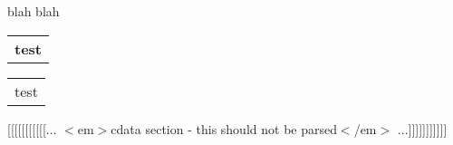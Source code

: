 

blah blah



\tabulinesep=1mm
\begin{longtabu}spread 0pt [c]{*{1}{|X[-1]}|}
\hline
{\bfseries{test}}   \\
\end{longtabu}


\tabulinesep=1mm
\begin{longtabu}spread 0pt [c]{*{1}{|X[-1]}|}
\hline


test





\\
\end{longtabu}


\mbox{[}\mbox{[}\mbox{[}\mbox{[}\mbox{[}\mbox{[}\mbox{[}\mbox{[}\mbox{[}\mbox{[}\mbox{[}... \texorpdfstring{$<$}{<}em\texorpdfstring{$>$}{>}cdata section -\/ this should not be parsed\texorpdfstring{$<$}{<}/em\texorpdfstring{$>$}{>} ...\mbox{]}\mbox{]}\mbox{]}\mbox{]}\mbox{]}\mbox{]}\mbox{]}\mbox{]}\mbox{]}\mbox{]}\mbox{]} 